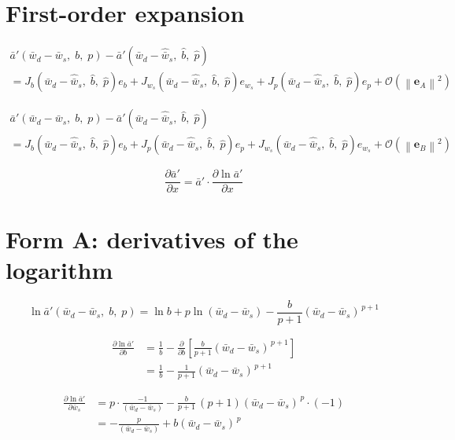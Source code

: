 \documentclass[11pt,a4paper,fontset=none]{ctexart}
\newcommand{\wt}{\left(\bar w_d-\bar w_s\right)}
\newcommand{\wtb}{\bar w_d-\bar w_s}
\newcommand{\whb}{\bar w_d-\hat{\bar w}_s}
\newcommand{\ap}{\bar a'}
\begin{document}
\section{First-order expansion}

\begin{multline}
\ap\!\left(\wtb,\;b,\;p\right)-\ap\!\left(\whb,\;\hat b,\;\hat p\right)\\[0.3em]
= J_b\!\left(\whb,\;\hat b,\;\hat p\right)e_{b}
+ J_{w_s}\!\left(\whb,\;\hat b,\;\hat p\right)e_{w_s}
+ J_p\!\left(\whb,\;\hat b,\;\hat p\right)e_{p}
+ \mathcal{O}\!\left(\left\|\bm{e}_A\right\|^2\right)
\end{multline}

\begin{multline}
\ap\!\left(\wtb,\;b,\;p\right)-\ap\!\left(\whb,\;\hat b,\;\hat p\right)\\[0.3em]
= J_b\!\left(\whb,\;\hat b,\;\hat p\right)e_{b}
+ J_p\!\left(\whb,\;\hat b,\;\hat p\right)e_{p}
+ J_{w_s}\!\left(\whb,\;\hat b,\;\hat p\right)e_{w_s}
+ \mathcal{O}\!\left(\left\|\bm{e}_B\right\|^2\right)
\end{multline}

\begin{equation}
\frac{\partial \ap}{\partial x}
= \ap \cdot \frac{\partial \ln \ap}{\partial x}
\end{equation}

\newpage

\section{Form A: derivatives of the logarithm}

\begin{equation}
\ln \ap\!\left(\wtb,\;b,\;p\right)
= \ln b + p \ln\wt - \frac{b}{p+1}\wt^{\,p+1}
\end{equation}

\begin{align}
\frac{\partial \ln \ap}{\partial b}
&= \frac{1}{b}
 - \frac{\partial}{\partial b}\left[\frac{b}{p+1}\wt^{\,p+1}\right]
\nonumber\\[0.4em]
&= \frac{1}{b}-\frac{1}{p+1}\wt^{\,p+1}
\end{align}

\begin{align}
\frac{\partial \ln \ap}{\partial \bar w_s}
&= p\cdot\frac{-1}{\wt}
 - \frac{b}{p+1}\,(p+1)\wt^{\,p}\cdot(-1)
\nonumber\\[0.4em]
&= -\frac{p}{\wt}+b\wt^{\,p}
\end{align}
\end{document}
